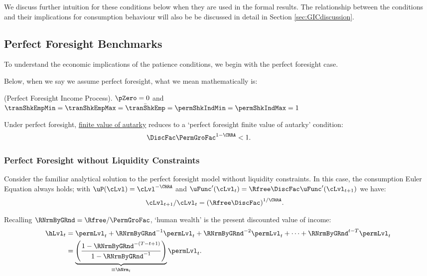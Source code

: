 \documentclass[BufferStockTheory]{subfiles}
\begin{document}
We discuss further intuition for these conditions below when they are used in the formal results.
The relationship between the conditions and their implications for consumption behaviour will also be be discussed in detail in Section \ref{sec:GICdiscussion}.


\hypertarget{Perfect-Foresight-Benchmarks}{}
\subsection{Perfect Foresight Benchmarks}\label{subsec:PFBbenchmark}

To understand the economic implications of the patience conditions, we begin with the perfect foresight case.


Below, when we say we assume perfect foresight, what we mean mathematically is:
%
\begin{assumI}\label{ass:pfincome}(Perfect Foresight Income Process).
$\pZero=0$ and $\tranShkEmpMin=\tranShkEmpMax=\bar{\tranShkEmp}=\permShkIndMin=\permShkIndMax=1$
\end{assumI}
%
Under perfect foresight,  \hyperlink{FVAC}{finite value of autarky} reduces to a `perfect foresight finite value of autarky' condition: 
%
\hypertarget{PFFVAC}{}
\begin{equation}\begin{gathered}\begin{aligned}  
         \DiscFac \PermGroFac^{1-\CRRA}  & <  1.  \phantom{\text{\PFFVAC:~~}}
\end{aligned}\end{gathered}\label{eq:PFFVAC}\end{equation}


\subsubsection{Perfect Foresight without Liquidity Constraints}\label{subsubsec:PFUncon}

Consider the familiar analytical solution to the perfect foresight model without liquidity constraints.
In this case, the consumption Euler Equation always holds; with $\uP(\cLvl)=\cLvl^{-\CRRA}$ and $\uFunc^{\prime}(\cLvl_{t})=\Rfree\DiscFac\uFunc^{\prime}(\cLvl_{t+1})$ we have:
%
%
\begin{align}
  \cLvl_{t+1}/\cLvl_{t}  & = {(\Rfree\DiscFac)}^{1/\CRRA}. \label{eq:cGroFac}
\end{align} 
%

Recalling $\RNrmByGRnd  = \Rfree/\PermGroFac$, `human wealth' is the present discounted value of income:
%
% 
\begin{align}
  \hLvl_{t}  & = \permLvl_{t}+\RNrmByGRnd^{-1} \permLvl_{t} + \RNrmByGRnd^{-2} \permLvl_{t} + \cdots + \RNrmByGRnd^{t-T} \permLvl_{t} \notag
  \\  & = \underbrace{\left(\frac{1-\RNrmByGRnd^{-(T-t+1)}}{1-\RNrmByGRnd^{-1}}\right)}_{\equiv \hNrm_{t}}\permLvl_{t} \label{eq:HDef}.
\end{align}
\end{document}
